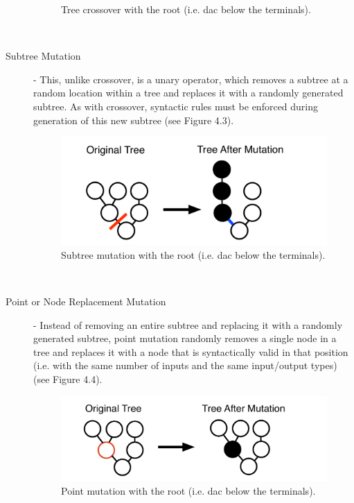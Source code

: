 \documentclass[12pt]{report} 	%
\numberwithin{figure}{chapter}
\numberwithin{table}{chapter}
\numberwithin{equation}{chapter}
\begin{document}
\begin{flushleft}
\begin{description}
\begin{figure}[h!]
\begin{center}
\caption[Crossover]{Tree crossover with the root (i.e. dac\texttildelow{} below the terminals).}
\end{center}
\end{figure}
\\
\item[Subtree Mutation] - This, unlike crossover, is a unary operator, which removes a subtree at a random location within a tree and replaces it with a randomly generated subtree. As with crossover, syntactic rules must be enforced during generation of this new subtree (see Figure 4.3).
\begin{figure}[h!]
\begin{center}
\includegraphics[scale=0.5]{SubtreeMutation}
\caption[Subtree mutation]{Subtree mutation with the root (i.e. dac\texttildelow{} below the terminals).}
\end{center}
\end{figure}
\\
\item[Point or Node Replacement Mutation] - Instead of removing an entire subtree and replacing it with a randomly generated subtree, point mutation randomly removes a single node in a tree and replaces it with a node that is syntactically valid in that position (i.e. with the same number of inputs and the same input/output types) (see Figure 4.4).
\begin{figure}[h!]
\begin{center}
\includegraphics[scale=0.5]{PointMutation}
\caption[Point mutation]{Point mutation with the root (i.e. dac\texttildelow{} below the terminals).}

\end{center}
\end{figure}
\end{description}
\end{flushleft}
\end{document}
